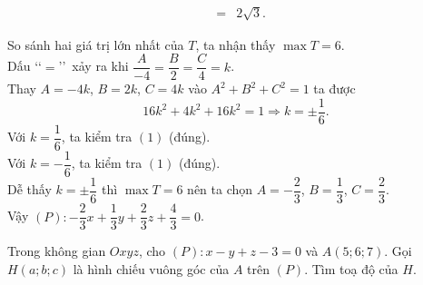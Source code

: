 \begin{bt}
{\begin{itemize}
\begin{eqnarray*}
				&=&2\sqrt{3}.
			\end{eqnarray*}
		\end{itemize}
		So sánh hai giá trị lớn nhất của $T$, ta nhận thấy $\max T=6$.\\
		Dấu \lq\lq$=$\rq\rq\, xảy ra khi $\dfrac{A}{-4}=\dfrac{B}{2}=\dfrac{C}{4}=k$.\\
		Thay $A=-4k$, $B=2k$, $C=4k$ vào $A^2+B^2+C^2=1$ ta được
		$$16k^2+4k^2+16k^2=1\Rightarrow k=\pm \dfrac{1}{6}.$$
		Với $k=\dfrac{1}{6}$, ta kiểm tra $(1)$ (đúng).\\
		Với $k=-\dfrac{1}{6}$, ta kiểm tra $(1)$ (đúng).\\
		Dễ thấy $k=\pm \dfrac{1}{6}$ thì $\max T=6$ nên ta chọn $A=-\dfrac{2}{3}$, $B=\dfrac{1}{3}$, $C=\dfrac{2}{3}$.\\
		Vậy $(P)\colon -\dfrac{2}{3}x+\dfrac{1}{3}y+\dfrac{2}{3}z+\dfrac{4}{3}=0$.
	}
\end{bt}

\begin{bt}%

	Trong không gian $Oxyz$, cho $(P)\colon x - y + z - 3 = 0$ và $A(5;6;7)$. Gọi $H(a;b;c)$ là hình chiếu vuông góc của $A$ trên $(P)$. Tìm toạ độ của $H$.
\end{bt}

